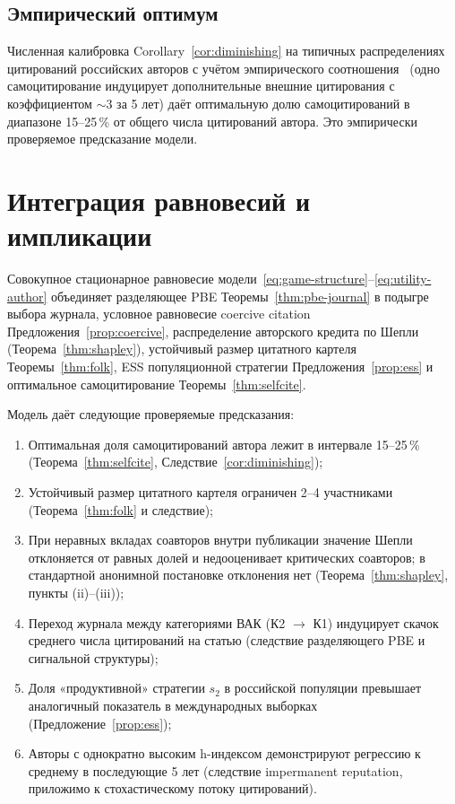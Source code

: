 \documentclass[12pt,a4paper]{article}
\theoremstyle{definition}
\begin{document}
\subsection{Эмпирический оптимум}

Численная калибровка Corollary~\ref{cor:diminishing} на типичных
распределениях цитирований российских авторов с учётом эмпирического
соотношения~\citep{fowler2007} (одно самоцитирование индуцирует
дополнительные внешние цитирования с коэффициентом $\sim 3$ за 5 лет)
даёт оптимальную долю самоцитирований в диапазоне 15--25\,\% от
общего числа цитирований автора. Это эмпирически проверяемое
предсказание модели.

\section{Интеграция равновесий и импликации}
\label{sec:integration}

Совокупное стационарное равновесие
модели~\eqref{eq:game-structure}--\eqref{eq:utility-author}
объединяет разделяющее PBE Теоремы~\ref{thm:pbe-journal} в подыгре
выбора журнала, условное равновесие coercive citation
Предложения~\ref{prop:coercive}, распределение авторского кредита по
Шепли (Теорема~\ref{thm:shapley}), устойчивый размер цитатного
картеля Теоремы~\ref{thm:folk}, ESS популяционной стратегии
Предложения~\ref{prop:ess} и оптимальное самоцитирование
Теоремы~\ref{thm:selfcite}.

Модель даёт следующие проверяемые предсказания:
\begin{enumerate}
  \item[(P1)] Оптимальная доля самоцитирований автора лежит в
    интервале 15--25\,\% (Теорема~\ref{thm:selfcite},
    Следствие~\ref{cor:diminishing});
  \item[(P2)] Устойчивый размер цитатного картеля ограничен 2--4
    участниками (Теорема~\ref{thm:folk} и следствие);
  \item[(P3)] При неравных вкладах соавторов внутри публикации
    значение Шепли отклоняется от равных долей и недооценивает
    критических соавторов; в стандартной анонимной постановке
    отклонения нет (Теорема~\ref{thm:shapley}, пункты (ii)--(iii));
  \item[(P4)] Переход журнала между категориями ВАК (К2 $\to$ К1)
    индуцирует скачок среднего числа цитирований на статью (следствие
    разделяющего PBE и сигнальной структуры);
  \item[(P5)] Доля «продуктивной» стратегии $s_2$ в российской
    популяции превышает аналогичный показатель в международных
    выборках (Предложение~\ref{prop:ess});
  \item[(P6)] Авторы с однократно высоким h-индексом демонстрируют
    регрессию к среднему в последующие 5 лет (следствие impermanent
    reputation, приложимо к стохастическому потоку цитирований).
\end{enumerate}
\end{document}
